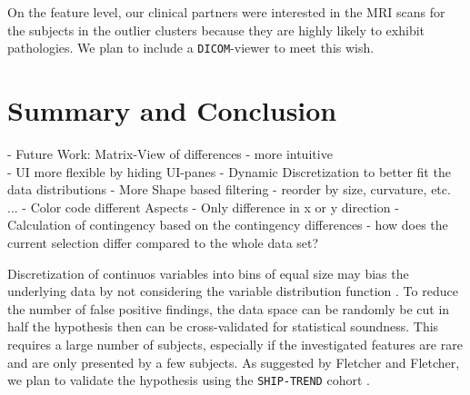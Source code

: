 \documentclass[journal]{style/vgtc} 			          %
\begin{document}
On the feature level, our clinical partners were interested in the MRI scans for the subjects in the outlier clusters because they are highly likely to exhibit pathologies.
%
We plan to include a \texttt{DICOM}-viewer to meet this wish.


\section{Summary and Conclusion}
- Future Work: Matrix-View of differences - more intuitive\\
- UI more flexible by hiding UI-panes
- Dynamic Discretization to better fit the data distributions
- More Shape based filtering - reorder by size, curvature, etc. ...
- Color code different Aspects - Only difference in x or y direction
- Calculation of contingency based on the contingency differences - how does the current selection differ compared to the whole data set?

Discretization of continuos variables into bins of equal size may bias the underlying data by not considering the variable distribution function \cite{Fletcher2012}.
To reduce the number of false positive findings, the data space can be randomly be cut in half the hypothesis then can be cross-validated for statistical soundness.
%
This requires a large number of subjects, especially if the investigated features are rare and are only presented by a few subjects.
%
As suggested by Fletcher and Fletcher, we plan to validate the hypothesis using the \texttt{SHIP-TREND} cohort \cite{Fletcher2012}.





\end{document}
